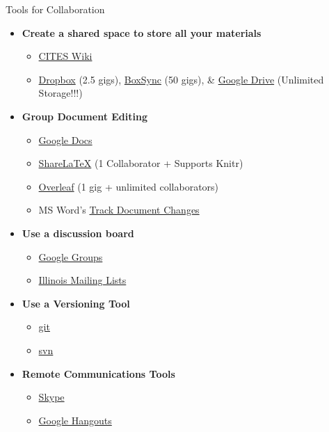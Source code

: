 \begin{frame}{Tools for Collaboration}

\begin{itemize}
\tightlist
\item
  \textbf{Create a shared space to store all your materials}

  \begin{itemize}
  \tightlist
  \item
    \href{https://wiki.cites.illinois.edu/wiki/}{CITES Wiki}
  \item
    \href{www.dropbox.com}{Dropbox} (2.5 gigs),
    \href{https://app.box.com/}{BoxSync} (50 gigs), \&
    \href{https://drive.google.com}{Google Drive} (Unlimited Storage!!!)
  \end{itemize}
\item
  \textbf{Group Document Editing}

  \begin{itemize}
  \tightlist
  \item
    \href{https://docs.google.com}{Google Docs}
  \item
    \href{www.sharelatex.com}{ShareLaTeX} (1 Collaborator + Supports
    Knitr)
  \item
    \href{https://www.overleaf.com/}{Overleaf} (1 gig + unlimited
    collaborators)
  \item
    MS Word's
    \href{https://support.office.com/en-us/article/Track-changes-while-you-edit-024158a3-7e62-4f05-8bb7-dc3ecf0295c4}{Track
    Document Changes}
  \end{itemize}
\item
  \textbf{Use a discussion board}

  \begin{itemize}
  \tightlist
  \item
    \href{https://groups.google.com/forum/\#!overview}{Google Groups}
  \item
    \href{http://www.cites.illinois.edu/maillist/}{Illinois Mailing
    Lists}
  \end{itemize}
\item
  \textbf{Use a Versioning Tool}

  \begin{itemize}
  \tightlist
  \item
    \href{http://git-scm.com/downloads}{git}
  \item
    \href{https://subversion.apache.org/packages.html}{svn}
  \end{itemize}
\item
  \textbf{Remote Communications Tools}

  \begin{itemize}
  \tightlist
  \item
    \href{http://www.skype.com/en/download-skype/skype-for-computer/}{Skype}
  \item
    \href{https://www.google.com/hangouts}{Google Hangouts}
  \end{itemize}
\end{itemize}

\end{frame}

